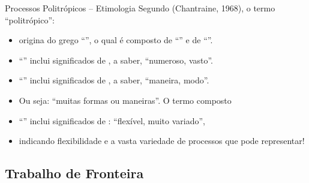    \begin{frame}{Processos Politrópicos -- Etimologia}\vspace*{-2em}
        Segundo (Chantraine, 1968), o termo ``politrópico'': \\[\medskipamount]
        \begin{itemize}
            \item<1-> origina do grego \alert{``''}, o qual é composto de
                \alert{``''} e de \alert{``''}. \\[\medskipamount]
            \item<2-> \alert{``''} inclui significados de , a saber, ``numeroso, vasto''. \\[\medskipamount]
            \item<3-> \alert{``''} inclui significados de , a saber, ``maneira, modo''. \\[\medskipamount]
            \item<4-> Ou seja: \alert{``muitas formas ou maneiras''}. O termo composto
                \\[\medskipamount]
            \item<5-> \alert{``''} inclui significados de : ``flexível, muito variado'', \\[\medskipamount]
            \item<6-> indicando \alert{flexibilidade} e a vasta \alert{variedade} de processos
                que pode representar!
        \end{itemize}
    \end{frame}

\subsection{Trabalho de Fronteira}

